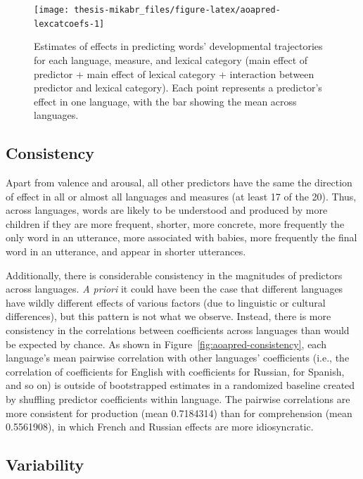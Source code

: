 \documentclass[
   11pt,
       ]{book}
\begin{document}
\begin{figure}

{\centering \texttt{[image: thesis-mikabr\_files/figure-latex/aoapred-lexcatcoefs-1]} 

}

\caption{Estimates of effects in predicting words' developmental trajectories for each language, measure, and lexical category (main effect of predictor + main effect of lexical category + interaction between predictor and lexical category). Each point represents a predictor's effect in one language, with the bar showing the mean across languages.}\label{fig:aoapred-lexcatcoefs}
\end{figure}

\hypertarget{consistency}{%
\subsection{Consistency}\label{consistency}}

Apart from valence and arousal, all other predictors have the same the direction of effect in all or almost all languages and measures (at least 17 of the 20). Thus, across languages, words are likely to be understood and produced by more children if they are more frequent, shorter, more concrete, more frequently the only word in an utterance, more associated with babies, more frequently the final word in an utterance, and appear in shorter utterances.

Additionally, there is considerable consistency in the magnitudes of predictors across languages. \emph{A priori} it could have been the case that different languages have wildly different effects of various factors (due to linguistic or cultural differences), but this pattern is not what we observe. Instead, there is more consistency in the correlations between coefficients across languages than would be expected by chance. As shown in Figure~\ref{fig:aoapred-consistency}, each language's mean pairwise correlation with other languages' coefficients (i.e., the correlation of coefficients for English with coefficients for Russian, for Spanish, and so on) is outside of bootstrapped estimates in a randomized baseline created by shuffling predictor coefficients within language. The pairwise correlations are more consistent for production (mean 0.7184314) than for comprehension (mean 0.5561908), in which French and Russian effects are more idiosyncratic.

\hypertarget{variability}{%
\subsection{Variability}\label{variability}}
\end{document}
